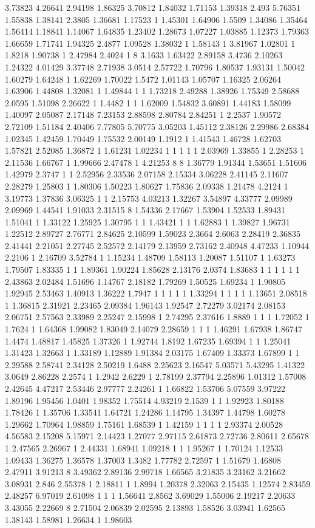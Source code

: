 3.73823 4.26641 2.94198 1.86325 3.70812 1.84032 1.71153 1.39318 2.493 5.76351 1.55838 1.38141 2.3805 1.36681 1.17523 1 1.45301 1.64906 1.5509 1.34086 1.35464 1.56414 1.18841 1.14067 1.64835 1.23402 1.28673 1.07227 1.03885 1.12373 1.79363 1.66659 1.71741 1.94325 2.4877 1.09528 1.38032 1 1.58143 1 3.81967 1.02801 1 1.8218 1.90738 1 2.47984 2.4024 1 8 3.1633 1.63422 2.89158 3.4736 2.10263 1.24322 4.01429 3.37748 2.71938 3.0514 2.57722 1.70796 1.80537 1.93131 1.50042 1.60279 1.64248 1 1.62269 1.70022 1.5472 1.01143 1.05707 1.16325 2.06264 1.63906 1.44808 1.32081 1 1.49844 1 1 1.73218 2.49288 1.38926 1.75349 2.58688 2.0595 1.51098 2.26622 1 1.4482 1 1 1.62009 1.54832 3.60891 1.44183 1.58099 1.40097 2.05087 2.17148 7.23153 2.88598 2.80784 2.84251 1 2.2537 1.90572 2.72109 1.51184 2.40406 7.77805 5.70775 3.05203 1.45112 2.38126 2.29986 2.68384 1.02345 1.42459 1.70449 1.75532 2.00149 1.1912 1 1.41543 1.46728 1.62703 1.57821 2.52085 1.36872 1 1.61231 1.02234 1 1 1 1 1 2.03969 1.33855 1 2.28253 1 2.11536 1.66767 1 1.99666 2.47478 1 4.21253 8 8 1.36779 1.91344 1.53651 1.51606 1.42979 2.3747 1 1 2.52956 2.33536 2.07158 2.15334 3.06228 2.41145 2.11607 2.28279 1.25803 1 1.80306 1.50223 1.80627 1.75836 2.09338 1.21478 4.2124 1 3.19773 1.37836 3.06325 1 1 2.15753 4.03213 1.32267 3.54897 4.33777 2.09989 2.09969 1.44541 1.91033 2.31515 8 1.54336 2.17667 1.53904 1.52533 1.89431 1.51041 1 1.33122 1.25925 1.30795 1 1 1.43421 1 1 1.62883 1 1.39827 1.96731 1.22512 2.89727 2.76771 2.84625 2.10599 1.59023 2.3664 2.6063 2.28419 2.36835 2.41441 2.21051 2.27745 2.52572 2.14179 2.13959 2.73162 2.40948 4.47233 1.10944 2.2106 1 2.16709 3.52784 1 1.15234 1.48709 1.58113 1.20087 1.51107 1 1.63273 1.79507 1.83335 1 1 1.89361 1.90224 1.85628 2.13176 2.0374 1.83683 1 1 1 1 1 1 2.43863 2.02484 1.51696 1.14767 2.18182 1.79269 1.50525 1.69234 1 1.90805 1.92945 2.53463 1.40913 1.36222 1.7947 1 1 1 1 1 1.33294 1 1 1 1 1.13651 2.08518 1 1.36815 2.31921 2.23465 2.09384 1.96143 1.92547 2.72279 3.02174 2.08153 2.06751 2.57563 2.33989 2.25247 2.15998 1 2.74295 2.37616 1.8889 1 1 1 1.72052 1 1.7624 1 1.64368 1.99082 1.83049 2.14079 2.28659 1 1 1 1.46291 1.67938 1.86747 1.4474 1.48817 1.45825 1.37326 1 1.92744 1.8192 1.67235 1.69394 1 1 1.25041 1.31423 1.32663 1 1.33189 1.12889 1.91384 2.03175 1.67409 1.33373 1.67899 1 1 2.29588 2.58741 2.34128 2.50219 1.6488 2.25623 2.16547 5.03571 5.43295 1.41322 3.0649 2.86228 2.2574 1 1.2942 2.6229 1 2.78199 2.37794 2.25896 1.01312 1.57008 2.42645 4.47217 2.53446 2.97777 2.24261 1 1.66822 1.53706 5.07559 3.97222 1.89196 1.95456 1.0401 1.98352 1.75514 4.93219 2.1539 1 1 1.92923 1.80188 1.78426 1 1.35706 1.33541 1.64721 1.24286 1.14795 1.34397 1.44798 1.60278 1.29662 1.70964 1.98859 1.75161 1.68539 1 1.42159 1 1 1 1 2.93374 2.00528 4.56583 2.15208 5.15971 2.14423 1.27077 2.97115 2.61873 2.72736 2.80611 2.65678 1 2.47565 2.26967 1 2.44331 1.68941 1.09218 1 1 1.95267 1 1.70124 1.12533 1.09433 1.36275 1.36578 1.37003 1.3482 1.77782 2.72597 1 1.51679 1.46808 2.47911 3.91213 8 3.49362 2.89136 2.99718 1.66565 3.21835 3.23162 3.21662 3.08931 2.846 2.55378 1 2.18811 1 1.8994 1.20378 2.32063 2.15435 1.12574 2.83459 2.48257 6.97019 2.61098 1 1 1 1.56641 2.8562 3.69029 1.55006 2.19217 2.20633 3.43055 2.22669 8 2.71504 2.06839 2.02595 2.13893 1.58526 3.03941 1.62565 1.38143 1.58981 1.26634 1 1.98603 